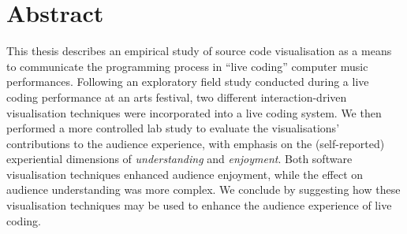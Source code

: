 
\chapter*{Abstract}
\label{chap:abstract}

This thesis describes an empirical study of source code visualisation
as a means to communicate the programming process in ``live coding''
computer music performances. Following an exploratory field study
conducted during a live coding performance at an arts festival, two
different interaction-driven visualisation techniques were
incorporated into a live coding system. We then performed a more
controlled lab study to evaluate the visualisations' contributions
to the audience experience, with emphasis on the (self-reported)
experiential dimensions of \emph{understanding} and
\emph{enjoyment}. Both software visualisation techniques enhanced
audience enjoyment, while the effect on audience understanding was
more complex. We conclude by suggesting how these visualisation
techniques may be used to enhance the audience experience of live
coding.






